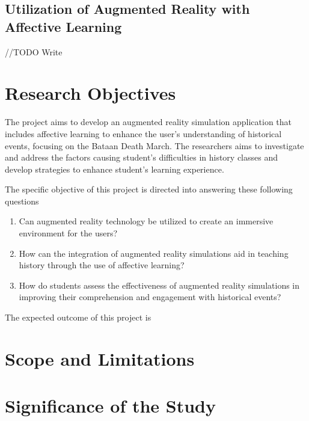\subsection{Utilization of Augmented Reality with Affective Learning}
//TODO Write


\section{Research Objectives}
The project aims to develop an augmented reality simulation application that includes affective learning to enhance the user's understanding of historical events, focusing on the Bataan Death March. The researchers aims to investigate and address the factors causing student's difficulties in history classes and develop strategies to enhance student's learning experience.

The specific objective of this project is directed into answering these following questions
\begin{enumerate}
    \item Can augmented reality technology be utilized to create an immersive environment for the users?
    \item How can the integration of augmented reality simulations aid in teaching history through the use of affective learning?
    \item How do students assess the effectiveness of augmented reality simulations in improving their comprehension and engagement with historical events? 
\end{enumerate}

The expected outcome of this project is




\section{Scope and Limitations}

\section{Significance of the Study}